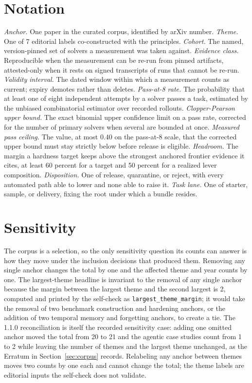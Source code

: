 \documentclass[11pt]{article}
\begin{document}
\section{Notation}

\emph{Anchor.} One paper in the curated corpus, identified by arXiv number. \emph{Theme.} One of 7 editorial labels co-constructed with the principles. \emph{Cohort.} The named, version-pinned set of solvers a measurement was taken against. \emph{Evidence class.} Reproducible when the measurement can be re-run from pinned artifacts, attested-only when it rests on signed transcripts of runs that cannot be re-run. \emph{Validity interval.} The dated window within which a measurement counts as current; expiry demotes rather than deletes. \emph{Pass-at-8 rate.} The probability that at least one of eight independent attempts by a solver passes a task, estimated by the unbiased combinatorial estimator over recorded rollouts. \emph{Clopper-Pearson upper bound.} The exact binomial upper confidence limit on a pass rate, corrected for the number of primary solvers when several are bounded at once. \emph{Measured pass ceiling.} The value, at most 0.40 on the pass-at-8 scale, that the corrected upper bound must stay strictly below before release is eligible. \emph{Headroom.} The margin a hardness target keeps above the strongest anchored frontier evidence it cites, at least 60 percent for a target and 50 percent for a realized lever composition. \emph{Disposition.} One of release, quarantine, or reject, with every automated path able to lower and none able to raise it. \emph{Task lane.} One of starter, sample, or delivery, fixing the root under which a bundle resides.

\section{Sensitivity}

The corpus is a selection, so the only sensitivity question its counts can answer is how they move under the inclusion decisions that produced them. Removing any single anchor changes the total by one and the affected theme and year counts by one. The largest-theme headline is invariant to the removal of any single anchor because the margin between the largest theme and the second largest is 2, computed and printed by the self-check as \texttt{largest\_theme\_margin}; it would take the removal of two benchmark construction and hardening anchors, or the addition of two temporal memory and forgetting anchors, to create a tie. The 1.1.0 reconciliation is itself the recorded sensitivity case: adding one omitted anchor moved the total from 20 to 21 and the agentic case studies count from 1 to 2 while leaving the number of themes and the largest theme unchanged, as the Erratum in Section~\ref{sec:corpus} records. Relabeling any anchor between themes moves two counts by one each and cannot change the total; the theme labels are editorial inputs the self-check does not validate.


\end{document}
